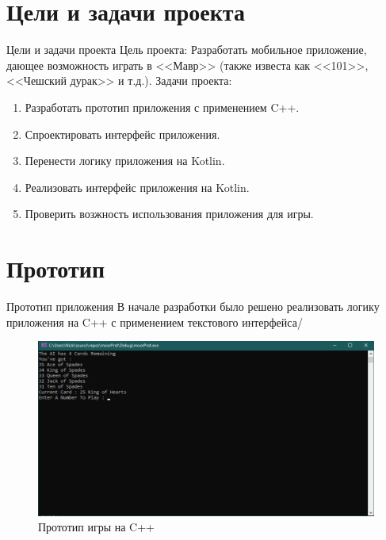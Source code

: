 \documentclass[aspectratio=169,xcolor=dvipsnames]{beamer}
\begin{document}
\section{Цели и задачи проекта}
\begin{frame}[fragile]{Цели и задачи проекта}
Цель проекта: Разработать мобильное приложение, дающее возможность играть в <<Мавр>> (также известа как <<101>>, <<Чешский дурак>> и т.д.).
\newline\newline
Задачи проекта: 
\begin{enumerate} 
    \item Разработать прототип приложения с применением C++.
    \item Спроектировать интерфейс приложения.
    \item Перенести логику приложения на Kotlin.
    \item Реализовать интерфейс приложения на Kotlin.
    \item Проверить возжность использования приложения для игры.
\end{enumerate}
\end{frame}

\section{Прототип}
\begin{frame}{Прототип приложения}
В начале разработки было решено реализовать логику приложения на C++ с применением текстового интерфейса/
    \begin{figure}
        \centering
        \includegraphics[scale=0.4]{prototype.png}
        \caption{Прототип игры на C++}
        \label{fig:my_label}
    \end{figure}
    
\end{frame}
\end{document}
